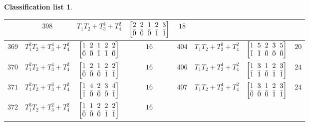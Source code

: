 \documentclass[pdftex]{sigma}%
\theoremstyle{definition}
\newtheorem{class-list}[thm]{Classification list}
\numberwithin{equation}{section}
\begin{document}
\begin{class-list}
\begin{table}[h!]
\begin{tabu}{c|c|c|c||c|c|c|c}
&${398}$&${T_{1}T_{2}+T_{3}^{4}+T_{4}^{2}}$
&$\arraycolsep=1mm\begin{bmatrix}{2} & {2} & {1} & {2} & {3} \\ {\bar{0}} & {\bar{0}} & {\bar{0}} & {\bar{1}} & {\bar{1}}\end{bmatrix}$&${18}$
\\
\hline
${369}$&${T_{1}^{2}T_{2}+T_{3}^{4}+T_{4}^{2}}$
&$\arraycolsep=1mm\begin{bmatrix}{1} & {2} & {1} & {2} & {2} \\ {\bar{0}} & {\bar{0}} & {\bar{1}} & {\bar{1}} & {\bar{0}}\end{bmatrix}$&${16}$
&${404}$&${T_{1}T_{2}+T_{3}^{3}+T_{4}^{2}}$
&$\arraycolsep=1mm\begin{bmatrix}{1} & {5} & {2} & {3} & {5} \\ {\bar{1}} & {\bar{1}} & {\bar{0}} & {\bar{0}} & {\bar{0}}\end{bmatrix}$&${20}$
\\
\hline
${370}$&${T_{1}^{2}T_{2}+T_{3}^{4}+T_{4}^{2}}$
&$\arraycolsep=1mm\begin{bmatrix}{1} & {2} & {1} & {2} & {2} \\ {\bar{0}} & {\bar{0}} & {\bar{0}} & {\bar{1}} & {\bar{1}}\end{bmatrix}$&${16}$
&${406}$&${T_{1}T_{2}+T_{3}^{4}+T_{4}^{2}}$
&$\arraycolsep=1mm\begin{bmatrix}{1} & {3} & {1} & {2} & {3} \\ {\bar{1}} & {\bar{1}} & {\bar{0}} & {\bar{1}} & {\bar{1}}\end{bmatrix}$&${24}$
\\
\hline
${371}$&${T_{1}^{2}T_{2}+T_{3}^{3}+T_{4}^{2}}$
&$\arraycolsep=1mm\begin{bmatrix}{1} & {4} & {2} & {3} & {4} \\ {\bar{1}} & {\bar{0}} & {\bar{0}} & {\bar{0}} & {\bar{1}}\end{bmatrix}$&${16}$
&${407}$&${T_{1}T_{2}+T_{3}^{4}+T_{4}^{2}}$
&$\arraycolsep=1mm\begin{bmatrix}{1} & {3} & {1} & {2} & {3} \\ {\bar{0}} & {\bar{0}} & {\bar{0}} & {\bar{1}} & {\bar{1}}\end{bmatrix}$&${24}$
\\
\hline
${372}$&${T_{1}^{3}T_{2}+T_{3}^{2}+T_{4}^{2}}$
&$\arraycolsep=1mm\begin{bmatrix}{1} & {1} & {2} & {2} & {2} \\ {\bar{0}} & {\bar{0}} & {\bar{0}} & {\bar{1}} & {\bar{1}}\end{bmatrix}$&${16}$

\end{tabu}
\end{table}
\end{class-list}
\end{document}
